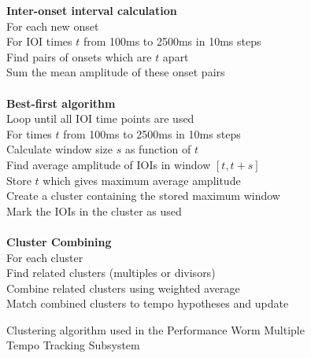 \documentclass[a4paper, 11pt]{article}
\begin{document}
\begin{figure}[h]
	\hspace{10mm} \textbf{Inter-onset interval calculation}\\
	\hspace*{10mm} For each new onset\\
	\hspace*{20mm} For IOI times $\mathit{t}$ from 100ms to 2500ms in 10ms steps\\
	\hspace*{30mm} Find pairs of onsets which are $\mathit{t}$ apart\\
	\hspace*{30mm} Sum the mean amplitude of these onset pairs\\
	\hspace*{20mm} \\
	\hspace*{20mm} \textbf{Best-first algorithm}\\
	\hspace*{20mm} Loop until all IOI time points are used\\
	\hspace*{30mm} For times $\mathit{t}$ from 100ms to 2500ms in 10ms steps\\
	\hspace*{40mm} Calculate window size $\mathit{s}$ as function of $\mathit{t}$\\
	\hspace*{40mm} Find average amplitude of IOIs in window $\mathit{[t, t + s]}$\\
	\hspace*{40mm} Store $\mathit{t}$ which gives maximum average amplitude\\
	\hspace*{30mm} Create a cluster containing the stored maximum window\\
	\hspace*{30mm} Mark the IOIs in the cluster as used\\
	\hspace*{20mm} \\
	\hspace*{20mm} \textbf{Cluster Combining}\\
	\hspace*{20mm} For each cluster\\
	\hspace*{30mm} Find related clusters (multiples or divisors)\\
	\hspace*{30mm} Combine related clusters using weighted average\\
	\hspace*{20mm} Match combined clusters to tempo hypotheses and update\\
	\caption{Clustering algorithm used in the Performance Worm Multiple Tempo Tracking Subsystem \cite{dixonGoeblWidmer}}
	\label{fig: clusterAl}
\end{figure}
\end{document}
